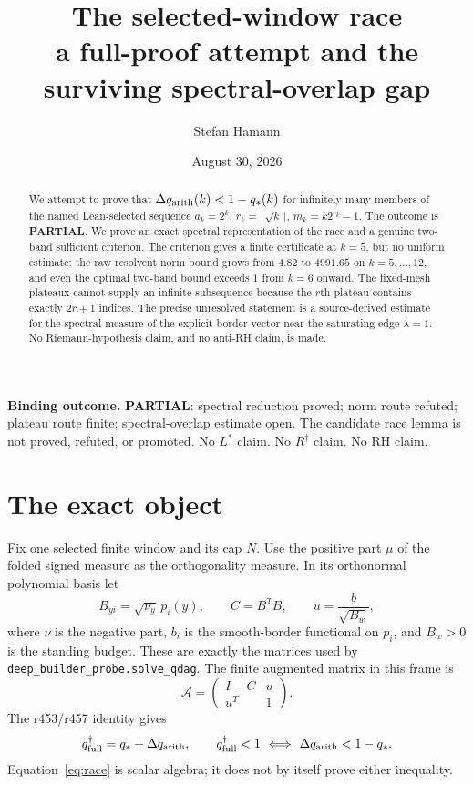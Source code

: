\documentclass[11pt]{article}
\title{\bfseries The selected-window race\\[2mm]
\large a full-proof attempt and the surviving spectral-overlap gap}
\author{Stefan Hamann}
\date{August 30, 2026}
\theoremstyle{remark}
\newcommand{\qfull}{q^{\dagger}_{\mathrm{full}}}
\newcommand{\qstar}{q_*}
\begin{document}
\maketitle

\begin{abstract}\noindent
We attempt to prove that
$\Delta q_{\rm arith}(k)<1-\qstar(k)$ for infinitely many members of
the named Lean-selected sequence
$a_k=2^k$, $r_k=\lfloor\sqrt{k}\rfloor$,
$m_k=k2^{r_k}-1$.
The outcome is \textbf{PARTIAL}.
We prove an exact spectral representation of the race and a genuine
two-band sufficient criterion.  The criterion gives a finite
certificate at $k=5$, but no uniform estimate: the raw resolvent norm
bound grows from $4.82$ to $4991.65$ on $k=5,\ldots,12$, and even the
optimal two-band bound exceeds $1$ from $k=6$ onward.  The fixed-mesh
plateaux cannot supply an infinite subsequence because the
$r$th plateau contains exactly $2r+1$ indices.
The precise unresolved statement is a source-derived estimate for the
spectral measure of the explicit border vector near the saturating
edge $\lambda=1$.  No Riemann-hypothesis claim, and no anti-RH claim,
is made.
\end{abstract}

\medskip\noindent
\textbf{Binding outcome.}\enspace
\textbf{PARTIAL}: spectral reduction proved; norm route refuted;
plateau route finite; spectral-overlap estimate open.
The candidate race lemma is not proved, refuted, or promoted.
No $L^*$ claim.  No $R^\dagger$ claim.  No RH claim.

\section{The exact object}

Fix one selected finite window and its cap $N$.
Use the positive part $\mu$ of the folded signed measure as the
orthogonality measure.  In its orthonormal polynomial basis let
\[
 B_{yi}=\sqrt{\nu_y}\,p_i(y),\qquad
 C=B^{T}B,\qquad
 u=\frac{b}{\sqrt{B_w}},
\]
where $\nu$ is the negative part, $b_i$ is the smooth-border
functional on $p_i$, and $B_w>0$ is the standing budget.
These are exactly the matrices used by
\texttt{deep\_builder\_probe.solve\_qdag}.  The finite augmented
matrix in this frame is
\begin{equation}\label{eq:A}
 \mathcal A=
 \begin{pmatrix}
 I-C&u\\ u^T&1
 \end{pmatrix}.
\end{equation}
The r453/r457 identity gives
\begin{equation}\label{eq:race}
 \qfull=\qstar+\Delta q_{\rm arith},\qquad
 \qfull<1
 \ \Longleftrightarrow\
 \Delta q_{\rm arith}<1-\qstar .
\end{equation}
Equation~\eqref{eq:race} is scalar algebra; it does not by itself
prove either inequality.
\end{document}
